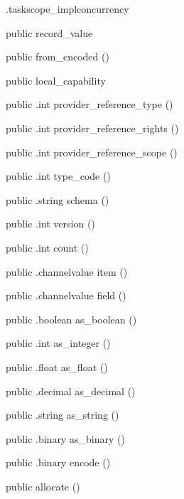 \begin{CrexxClass}{.taskscope\_impl}{concurrency}
\begin{Members}
    \Factory
      {public}
      {record\_value}
      {}

    \Factory
      {public}
      {from\_encoded}
      {()}

    \Factory
      {public}
      {local\_capability}
      {}

    \Method
      {public}
      {.int}
      {provider\_reference\_type}
      {()}

    \Method
      {public}
      {.int}
      {provider\_reference\_rights}
      {()}

    \Method
      {public}
      {.int}
      {provider\_reference\_scope}
      {()}

    \Method
      {public}
      {.int}
      {type\_code}
      {()}

    \Method
      {public}
      {.string}
      {schema}
      {()}

    \Method
      {public}
      {.int}
      {version}
      {()}

    \Method
      {public}
      {.int}
      {count}
      {()}

    \Method
      {public}
      {.channelvalue}
      {item}
      {()}

    \Method
      {public}
      {.channelvalue}
      {field}
      {()}

    \Method
      {public}
      {.boolean}
      {as\_boolean}
      {()}

    \Method
      {public}
      {.int}
      {as\_integer}
      {()}

    \Method
      {public}
      {.float}
      {as\_float}
      {()}

    \Method
      {public}
      {.decimal}
      {as\_decimal}
      {()}

    \Method
      {public}
      {.string}
      {as\_string}
      {()}

    \Method
      {public}
      {.binary}
      {as\_binary}
      {()}

    \Method
      {public}
      {.binary}
      {encode}
      {()}

    \Factory
      {public}
      {allocate}
      {()}


\end{Members}
\end{CrexxClass}
